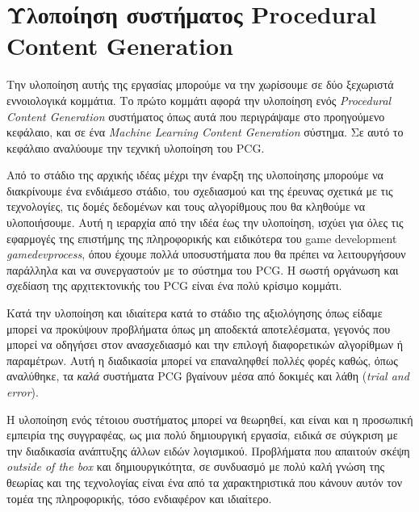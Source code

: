 \chapter{Υλοποίηση συστήματος Procedural Content Generation}

Την υλοποίηση αυτής της εργασίας μπορούμε να την χωρίσουμε σε δύο ξεχωριστά εννοιολογικά κομμάτια. Το πρώτο κομμάτι αφορά την υλοποίηση ενός \textit{Procedural Content Generation} συστήματος όπως αυτά που περιγράψαμε στο προηγούμενο κεφάλαιο, και σε ένα \textit{Machine Learning Content Generation} σύστημα. Σε αυτό το κεφάλαιο αναλύουμε την τεχνική υλοποίηση του PCG.
\par
Από το στάδιο της αρχικής ιδέας μέχρι την έναρξη της υλοποίησης μπορούμε να διακρίνουμε ένα ενδιάμεσο στάδιο, του σχεδιασμού και της έρευνας σχετικά με τις τεχνολογίες, τις δομές δεδομένων και τους αλγορίθμους που θα κληθούμε να υλοποιήσουμε. Αυτή η ιεραρχία από την ιδέα έως την υλοποίηση, ισχύει για όλες τις εφαρμογές της επιστήμης της πληροφορικής και ειδικότερα του game development \textit{gamedevprocess}, όπου έχουμε πολλά υποσυστήματα που θα πρέπει να λειτουργήσουν παράλληλα και να συνεργαστούν με το σύστημα του PCG. Η σωστή οργάνωση και σχεδίαση της αρχιτεκτονικής του PCG είναι ένα πολύ κρίσιμο κομμάτι.
\par
Κατά την υλοποίηση και ιδιαίτερα κατά το στάδιο της αξιολόγησης όπως είδαμε μπορεί να προκύψουν προβλήματα όπως μη αποδεκτά αποτελέσματα, γεγονός που μπορεί να οδηγήσει στον ανασχεδιασμό και την επιλογή διαφορετικών αλγορίθμων ή παραμέτρων. Αυτή η διαδικασία μπορεί να επαναληφθεί πολλές φορές καθώς, όπως αναλύθηκε, τα \textit{καλά} συστήματα PCG βγαίνουν μέσα από δοκιμές και λάθη (\textit{trial and error}).
\par
Η υλοποίηση ενός τέτοιου συστήματος μπορεί να θεωρηθεί, και είναι και η προσωπική εμπειρία της συγγραφέας, ως μια πολύ δημιουργική εργασία, ειδικά σε σύγκριση με την διαδικασία ανάπτυξης άλλων ειδών λογισμικού. Προβλήματα που απαιτούν σκέψη \textit{outside of the box} και δημιουργικότητα, σε συνδυασμό με πολύ καλή γνώση της θεωρίας και της τεχνολογίας είναι ένα από τα χαρακτηριστικά που κάνουν αυτόν τον τομέα της πληροφορικής, τόσο ενδιαφέρον και ιδιαίτερο.

